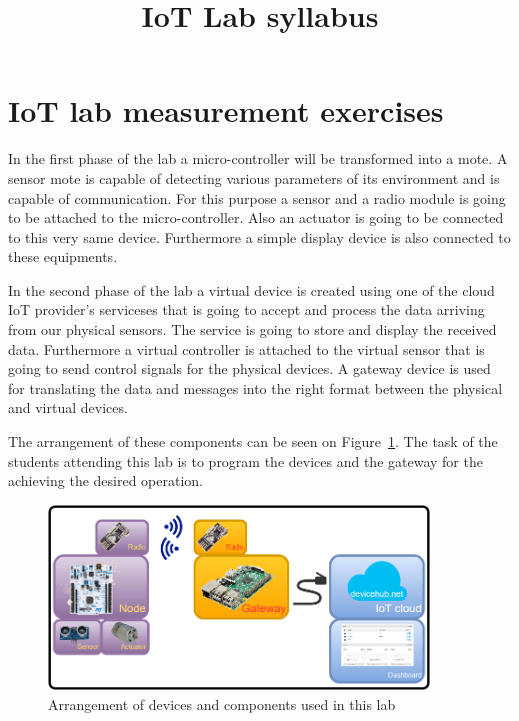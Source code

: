 \documentclass[a4paper]{article}
\title{IoT Lab syllabus}
\author{}
\date{}
\begin{document}
\maketitle

\tableofcontents

\section{IoT lab measurement exercises}

In the first phase of the lab a micro-controller will be transformed into a mote. A sensor mote is capable of detecting
various parameters of its environment and is capable of communication. For this purpose a sensor and a radio module is
going to be attached to the micro-controller. Also an actuator is going to be connected to this very same device.
Furthermore a simple display device is also connected to these equipments.

In the second phase of the lab a virtual device is created using one of the cloud IoT provider's serviceses that is going
to accept and process the data arriving from our physical sensors. The service is going to store and display the received data.
Furthermore a virtual controller is attached to the virtual sensor that is going to send control signals for the
physical devices. A gateway device is used for translating the data and messages into the right format between the physical and
virtual devices.

The arrangement of these components can be seen on Figure~\ref{fig:meas-arrangement}. The task of the students
attending this lab is to program the devices and the gateway for the achieving the desired operation.

\begin{figure}[H]
    \centering
    \includegraphics[width=0.9\textwidth]{figures/devices-arrangement.png}
    \caption{Arrangement of devices and components used in this lab}
    \label{fig:meas-arrangement}
\end{figure}
\end{document}
